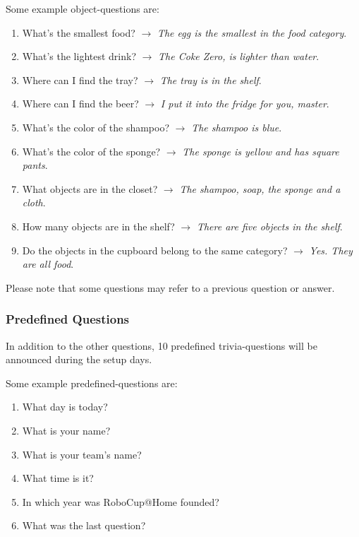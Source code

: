 Some example object-questions are:
\begin{enumerate}
    \item What's the smallest food? $\rightarrow$ \textit{The egg is the smallest in the food category}.
    \item What's the lightest drink? $\rightarrow$ \textit{The Coke Zero, is lighter than water}.
    \item Where can I find the tray? $\rightarrow$ \textit{The tray is in the shelf}.
    \item Where can I find the beer? $\rightarrow$ \textit{I put it into the fridge for you, master}.
    \item What's the color of the shampoo? $\rightarrow$ \textit{The shampoo is blue}.
    \item What's the color of the sponge? $\rightarrow$ \textit{The sponge is yellow and has square pants}.
    \item What objects are in the closet? $\rightarrow$ \textit{The shampoo, soap, the sponge and a cloth}.
    \item How many objects are in the shelf? $\rightarrow$ \textit{There are five objects in the shelf}.
    \item Do the objects in the cupboard belong to the same category? $\rightarrow$ \textit{Yes. They are all food}.
\end{enumerate}

Please note that some questions may refer to a previous question or answer.

\subsubsection{Predefined Questions}
In addition to the other questions, 10 predefined trivia-questions will be announced during the setup days.

Some example predefined-questions are:
\begin{enumerate}
    \item What day is today?
    \item What is your name?
    \item What is your team's name?
    \item What time is it?
    \item In which year was RoboCup@Home founded?
    \item What was the last question?
\end{enumerate}

